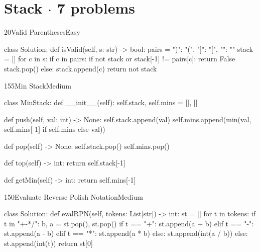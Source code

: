 \section{Stack \texorpdfstring{{\normalsize\color{muted}$\cdot$ 7 problems}}{- 7 problems}}

\begin{problem}{20}{Valid Parentheses}{Easy}
\begin{code}
class Solution:
    def isValid(self, s: str) -> bool:
        pairs = {")": "(", "]": "[", "}": "{"}
        stack = []
        for c in s:
            if c in pairs:
                if not stack or stack[-1] != pairs[c]:
                    return False
                stack.pop()
            else:
                stack.append(c)
        return not stack
\end{code}
\end{problem}

\begin{problem}{155}{Min Stack}{Medium}
\begin{code}
class MinStack:
    def __init__(self):
        self.stack, self.mins = [], []

    def push(self, val: int) -> None:
        self.stack.append(val)
        self.mins.append(min(val, self.mins[-1] if self.mins else val))

    def pop(self) -> None:
        self.stack.pop()
        self.mins.pop()

    def top(self) -> int:
        return self.stack[-1]

    def getMin(self) -> int:
        return self.mins[-1]
\end{code}
\end{problem}

\begin{problem}{150}{Evaluate Reverse Polish Notation}{Medium}
\begin{code}
class Solution:
    def evalRPN(self, tokens: List[str]) -> int:
        st = []
        for t in tokens:
            if t in "+-*/":
                b, a = st.pop(), st.pop()
                if t == "+": st.append(a + b)
                elif t == "-": st.append(a - b)
                elif t == "*": st.append(a * b)
                else: st.append(int(a / b))
            else:
                st.append(int(t))
        return st[0]
\end{code}
\end{problem}


